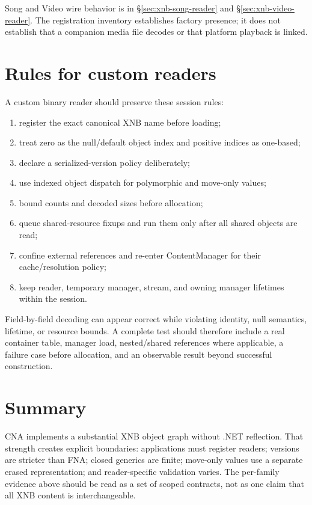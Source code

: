 Song and Video wire behavior is in \S\ref{sec:xnb-song-reader} and
\S\ref{sec:xnb-video-reader}. The registration inventory establishes factory presence; it does
not establish that a companion media file decodes or that platform playback is linked.

\section{Rules for custom readers}

A custom binary reader should preserve these session rules:

\begin{enumerate}
  \item register the exact canonical XNB name before loading;
  \item treat zero as the null/default object index and positive indices as one-based;
  \item declare a serialized-version policy deliberately;
  \item use indexed object dispatch for polymorphic and move-only values;
  \item bound counts and decoded sizes before allocation;
  \item queue shared-resource fixups and run them only after all shared objects are read;
  \item confine external references and re-enter ContentManager for their cache/resolution policy;
  \item keep reader, temporary manager, stream, and owning manager lifetimes within the session.
\end{enumerate}

Field-by-field decoding can appear correct while violating identity, null semantics, lifetime, or
resource bounds. A complete test should therefore include a real container table, manager load,
nested/shared references where applicable, a failure case before allocation, and an observable
result beyond successful construction.

\section{Summary}

CNA implements a substantial XNB object graph without .NET reflection. That strength creates
explicit boundaries: applications must register readers; versions are stricter than FNA; closed
generics are finite; move-only values use a separate erased representation; and reader-specific
validation varies. The per-family evidence above should be read as a set of scoped contracts, not
as one claim that all XNB content is interchangeable.
